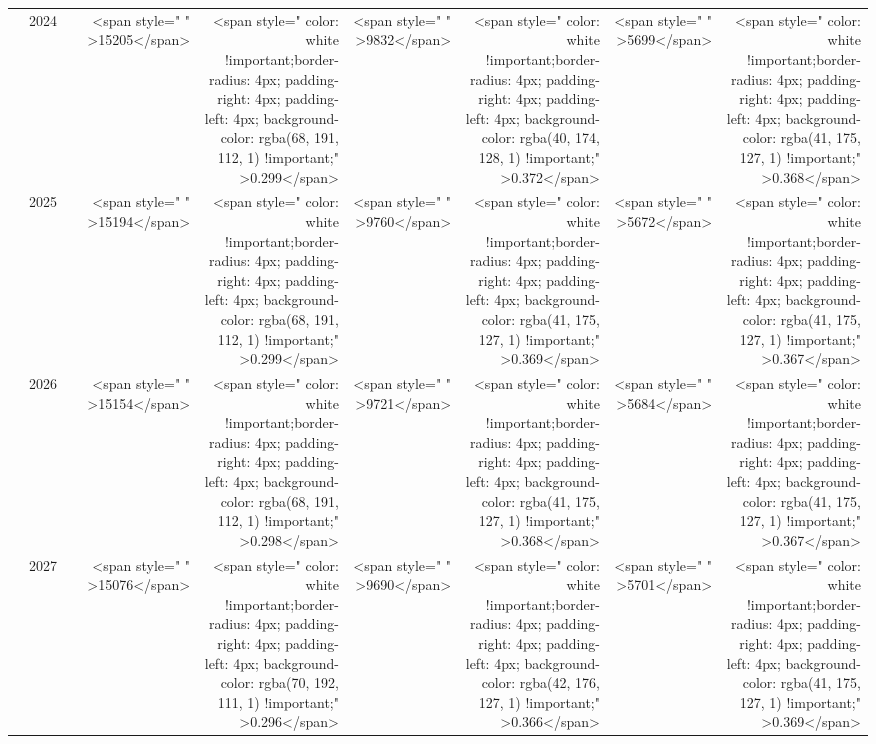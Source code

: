\begin{table}
\begin{tabular}[t]{>{}l|l>{}rr>{}r|rrrr}
 & 2024 & \cellcolor[HTML]{787877}{\textcolor{white}{722}} & <span style="     " >15205</span> & <span style="     color: white !important;border-radius: 4px; padding-right: 4px; padding-left: 4px; background-color: rgba(68, 191, 112, 1) !important;" >0.299</span> & <span style="     " >9832</span> & <span style="     color: white !important;border-radius: 4px; padding-right: 4px; padding-left: 4px; background-color: rgba(40, 174, 128, 1) !important;" >0.372</span> & <span style="     " >5699</span> & <span style="     color: white !important;border-radius: 4px; padding-right: 4px; padding-left: 4px; background-color: rgba(41, 175, 127, 1) !important;" >0.368</span>\\

 & 2025 & \cellcolor[HTML]{6B6C71}{\textcolor{white}{748}} & <span style="     " >15194</span> & <span style="     color: white !important;border-radius: 4px; padding-right: 4px; padding-left: 4px; background-color: rgba(68, 191, 112, 1) !important;" >0.299</span> & <span style="     " >9760</span> & <span style="     color: white !important;border-radius: 4px; padding-right: 4px; padding-left: 4px; background-color: rgba(41, 175, 127, 1) !important;" >0.369</span> & <span style="     " >5672</span> & <span style="     color: white !important;border-radius: 4px; padding-right: 4px; padding-left: 4px; background-color: rgba(41, 175, 127, 1) !important;" >0.367</span>\\

 & 2026 & \cellcolor[HTML]{5D616E}{\textcolor{white}{773}} & <span style="     " >15154</span> & <span style="     color: white !important;border-radius: 4px; padding-right: 4px; padding-left: 4px; background-color: rgba(68, 191, 112, 1) !important;" >0.298</span> & <span style="     " >9721</span> & <span style="     color: white !important;border-radius: 4px; padding-right: 4px; padding-left: 4px; background-color: rgba(41, 175, 127, 1) !important;" >0.368</span> & <span style="     " >5684</span> & <span style="     color: white !important;border-radius: 4px; padding-right: 4px; padding-left: 4px; background-color: rgba(41, 175, 127, 1) !important;" >0.367</span>\\

 & 2027 & \cellcolor[HTML]{545A6C}{\textcolor{white}{789}} & <span style="     " >15076</span> & <span style="     color: white !important;border-radius: 4px; padding-right: 4px; padding-left: 4px; background-color: rgba(70, 192, 111, 1) !important;" >0.296</span> & <span style="     " >9690</span> & <span style="     color: white !important;border-radius: 4px; padding-right: 4px; padding-left: 4px; background-color: rgba(42, 176, 127, 1) !important;" >0.366</span> & <span style="     " >5701</span> & <span style="     color: white !important;border-radius: 4px; padding-right: 4px; padding-left: 4px; background-color: rgba(41, 175, 127, 1) !important;" >0.369</span>\\


\end{tabular}
\end{table}
